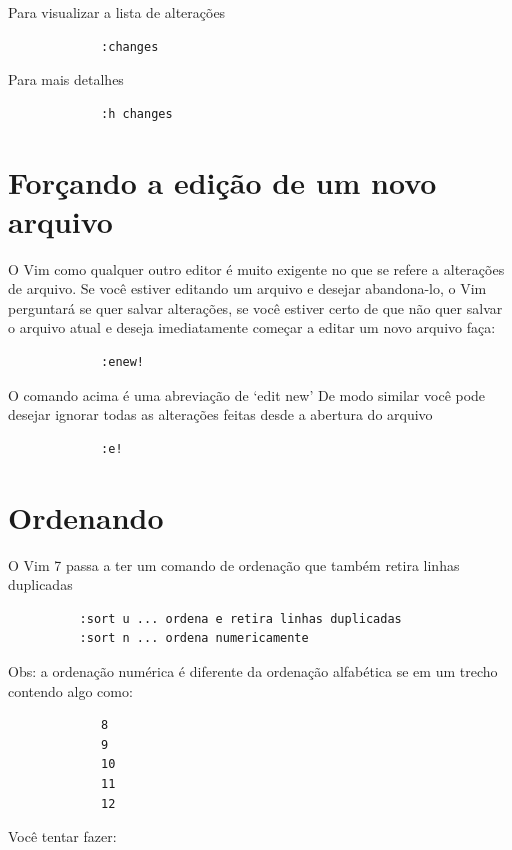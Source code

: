\documentclass[10pt,a4paper,openany]{book}
\begin{document}
Para visualizar a lista de alterações

\begin{verbatim}
			 :changes
\end{verbatim}

Para mais detalhes

\begin{verbatim}
			 :h changes
\end{verbatim}


\section{Forçando a edição de um novo arquivo}\label{sec:Forçando a edição de um novo arquivo}

O Vim como qualquer outro editor é muito exigente no que se refere a alterações
de arquivo.  Se você estiver editando um arquivo e desejar abandona-lo, o Vim
perguntará se quer salvar alterações, se você estiver certo de que não quer
salvar o arquivo atual e deseja imediatamente começar a editar um novo arquivo
faça:

\begin{verbatim}
			 :enew!
\end{verbatim}

O comando acima é uma abreviação de `edit new' De modo similar você pode
desejar ignorar todas as alterações feitas desde a abertura do arquivo

\begin{verbatim}
			 :e!
\end{verbatim}


\section{Ordenando}

O Vim 7 passa a ter um comando de ordenação que também retira linhas
duplicadas

\begin{verbatim}
		  :sort u ... ordena e retira linhas duplicadas
		  :sort n ... ordena numericamente
\end{verbatim}

Obs: a ordenação numérica é diferente da ordenação alfabética se em um
trecho contendo algo como:

\begin{verbatim}
			 8
			 9
			 10
			 11
			 12
\end{verbatim}

Você tentar fazer:
\end{document}

